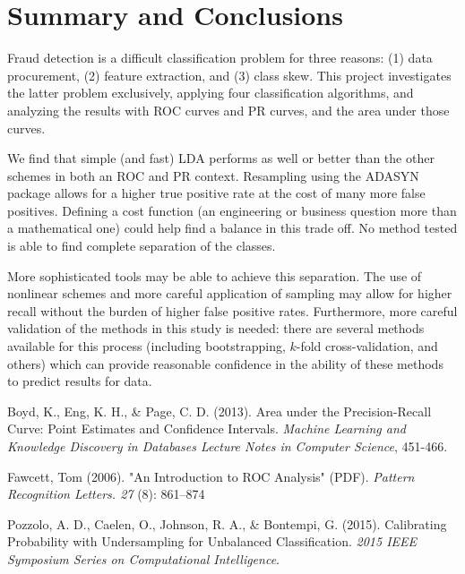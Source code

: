 \documentclass{article}
\begin{document}
\section{Summary and Conclusions}
Fraud detection is a difficult classification problem for three reasons: (1) data procurement, (2) feature extraction, and (3) class skew. This project investigates the latter problem exclusively, applying four classification algorithms, and analyzing the results with ROC curves and PR curves, and the area under those curves.

We find that simple (and fast) LDA performs as well or better than the other schemes in both an ROC and PR context. Resampling using the ADASYN package allows for a higher true positive rate at the cost of many more false positives. Defining a cost function (an engineering or business question  more than a mathematical one) could help find a balance in this trade off. No method tested is able to find complete separation of the classes.

More sophisticated tools may be able to achieve this separation. The use of nonlinear schemes and more careful application of sampling may allow for higher recall without the burden of higher false positive rates. Furthermore, more careful validation of the methods in this study is needed: there are several methods available for this process (including bootstrapping, $k$-fold cross-validation, and others\cite{boyd}) which can provide reasonable confidence in the ability of these methods to predict results for  data.

\clearpage
\begin{thebibliography}{9}

Boyd, K., Eng, K. H., \& Page, C. D. (2013). Area under the Precision-Recall Curve: Point Estimates and Confidence Intervals. \emph{Machine Learning and Knowledge Discovery in Databases Lecture Notes in Computer Science}, 451-466.

Fawcett, Tom (2006). "An Introduction to ROC Analysis" (PDF). \emph{Pattern Recognition Letters. 27} (8): 861–874

Pozzolo, A. D., Caelen, O., Johnson, R. A., \& Bontempi, G. (2015). Calibrating Probability with Undersampling for Unbalanced Classification. \emph{2015 IEEE Symposium Series on Computational Intelligence}.

\end{thebibliography}
\end{document}

